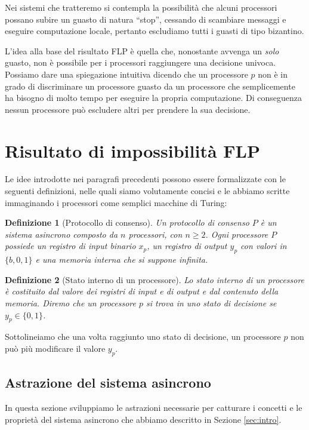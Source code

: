\documentclass{article}
\newtheorem{definizione}{Definizione}
\begin{document}
Nei sistemi che tratteremo si contempla la possibilit\`a che alcuni
processori possano subire un guasto di natura ``stop'', cessando di
scambiare messaggi e eseguire computazione locale, pertanto escludiamo
tutti i guasti di tipo bizantino.

L'idea alla base del risultato FLP \`e quella che, nonostante avvenga
un \emph{solo} guasto, non \`e possibile per i processori raggiungere
una decisione univoca. Possiamo dare una spiegazione intuitiva dicendo
che un processore $p$ non \`e in grado di discriminare un processore
guasto da un processore che semplicemente ha bisogno di molto tempo
per eseguire la propria computazione. Di conseguenza nessun processore
pu\`o escludere altri per prendere la sua decisione. 

\section{Risultato di impossibilit\`a FLP}

Le idee introdotte nei paragrafi precedenti possono essere
formalizzate con le seguenti definizioni, nelle quali siamo
volutamente concisi e le abbiamo scritte immaginando i processori come
semplici macchine di Turing:

\begin{definizione}[Protocollo di consenso]
  Un protocollo di consenso $P$ è un sistema asincrono composto da $n$
  processori, con $n\geq2$. Ogni processore $P$ possiede un registro
  di input binario $x_p$, un registro di output $y_p$ con valori in
  $\{b,0,1\}$ e una memoria interna che si suppone infinita.
\end{definizione}

\begin{definizione}[Stato interno di un processore]
  Lo stato interno di un processore è costituito dal valore dei
  registri di input e di output e dal contenuto della memoria.  Diremo
  che un processore $p$ si trova in uno stato di decisione se $y_p \in
  \lbrace 0,1 \rbrace$. 
\end{definizione}

Sottolineiamo che una volta raggiunto uno stato di decisione, un
processore $p$ non pu\`o pi\`u modificare il valore $y_p$.

\subsection{Astrazione del sistema asincrono}

In questa sezione sviluppiamo le astrazioni necessarie per catturare i
concetti e le propriet\`a del sistema asincrono che abbiamo descritto
in Sezione \ref{sec:intro}.
\end{document}
